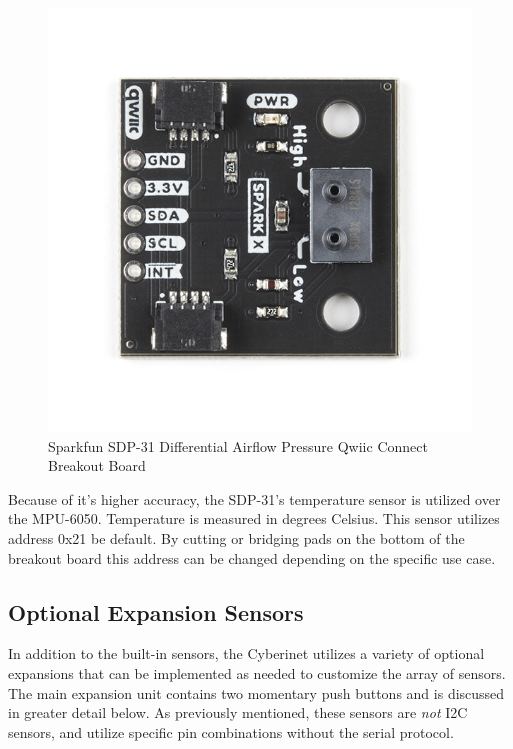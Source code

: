 \begin{center}
    \begin{figure}
        \centering
        \includegraphics[scale=1.5, angle=90]{diagrams/oem/spd31.jpg}
        \caption{Sparkfun SDP-31 Differential Airflow Pressure Qwiic Connect Breakout Board}
        \label{fig:sdp-31}
    \end{figure}
\end{center}

Because of it’s higher accuracy, the SDP-31’s temperature sensor is utilized over the MPU-6050. Temperature is measured in degrees Celsius. This sensor utilizes address 0x21 be default. By cutting or bridging pads on the bottom of the breakout board this address can be changed depending on the specific use case.




\subsection{Optional Expansion Sensors}
In addition to the built-in sensors, the Cyberinet utilizes a variety of optional expansions that can be implemented as needed to customize the array of sensors. The main expansion unit contains two momentary push buttons and is discussed in greater detail below. As previously mentioned, these sensors are \emph{not} I2C sensors, and utilize specific pin combinations without the serial protocol.

